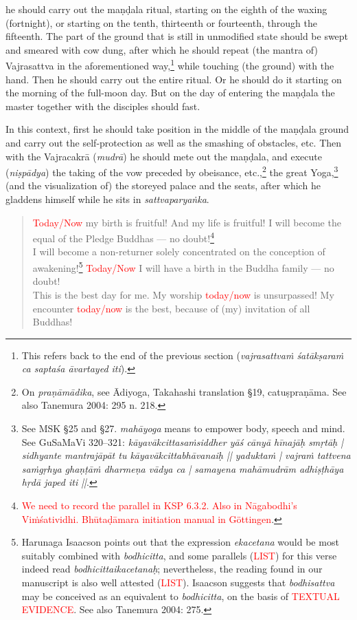 \documentclass[11pt]{book}
\newcommand{\red}[1]{\textcolor{red}{#1}}
\newcommand{\skt}[1]{\emph{#1}}
\begin{document}
\noindent he should carry out the maṇḍala ritual, starting on the eighth of the waxing (fortnight), or starting on the tenth, thirteenth or fourteenth, through the fifteenth. The part of the ground that is still in unmodified state should be swept and smeared with cow dung, after which he should repeat (the mantra of) Vajrasattva in the aforementioned way,\footnote{This refers back to the end of the previous section (\emph{vajrasattvaṁ śatākṣaraṁ ca saptaśa āvartayed iti}).} while touching (the ground) with the hand. Then he should carry out the entire ritual. Or he should do it starting on the morning of the full-moon day. But on the day of entering the maṇḍala the master together with the disciples should fast. 

In this context, first he should take position in the middle of the maṇḍala ground and carry out the self-protection as well as the smashing of obstacles, etc. Then with the Vajracakrā (\skt{mudrā}) he should mete out the maṇḍala, and execute (\skt{niṣpādya}) the taking of the vow preceded by obeisance, etc.,\footnote{On \skt{praṇāmādika}, see Ādiyoga, Takahashi translation §19, catuṣpraṇāma. See also Tanemura 2004: 295 n. 218.} the great Yoga,\footnote{See MSK §25 and §27. \skt{mahāyoga} means to empower body, speech and mind.  See GuSaMaVi 320–321: \skt{kāyavākcittasaṁsiddher yāś cānyā hīnajāḥ smṛtāḥ | sidhyante mantrajāpāt tu kāyavākcittabhāvanaiḥ || yaduktaṁ | vajraṁ tattvena saṁgṛhya ghaṇṭāṁ dharmeṇa vādya ca |
samayena mahāmudrām adhiṣṭhāya hṛdā japed iti ||}.} (and the visualization of) the storeyed palace and the seats, after which he gladdens himself while he sits in \emph{sattvaparyaṅka}.

\begin{verse}
	\red{Today/Now} my birth is fruitful! And my life is fruitful! I will become the equal of the Pledge Buddhas — no doubt!\footnote{\red{We need to record the parallel in KSP 6.3.2. Also in Nāgabodhi's Viṁśatividhi. Bhūtaḍāmara initiation manual in Göttingen}.}\\
	I will become a non-returner solely concentrated on the conception of awakening!\footnote{Harunaga Isaacson points out that the expression \skt{ekacetana} would be most suitably combined with \skt{bodhicitta}, and some parallels (\red{LIST}) for this verse indeed read \skt{bodhicittaikacetanaḥ}; nevertheless, the reading found in our manuscript is also well attested (\red{LIST}). Isaacson suggests that \skt{bodhisattva} may be conceived as an equivalent to \skt{bodhicitta}, on the basis of \red{TEXTUAL EVIDENCE}. See also Tanemura 2004: 275.} \red{Today/Now} I will have a birth in the Buddha family — no doubt!\\
	This is the best day for me. My worship \red{today/now} is unsurpassed! My encounter \red{today/now} is the best, because of (my) invitation of all Buddhas!
\end{verse}
	
\end{document}
